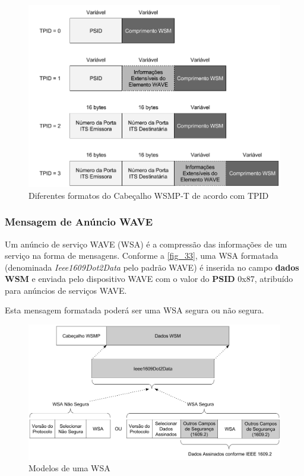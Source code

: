 \documentclass[
12pt,				%
openright,			%
oneside,			%
a4paper,			%
brazil,				%
]{abntex2}
\begin{document}
	\begin{figure} [H]
		\centering
		\includegraphics[scale=.45]{figuras/cap3/32DiferentesFormatosTPID}
		\caption{\label{fig_32}Diferentes formatos do Cabeçalho WSMP-T de acordo com TPID}
	\end{figure}

	\subsubsection{Mensagem de Anúncio WAVE}
	
	\par Um anúncio de serviço WAVE (WSA) é a compressão das informações de um serviço na forma de mensagens. Conforme a \autoref{fig_33}, uma WSA formatada (denominada \textit{Ieee1609Dot2Data} pelo padrão WAVE) é inserida no campo \textbf{dados WSM} e enviada pelo dispositivo WAVE com o valor do \textbf{PSID} 0x87, atribuído para anúncios de serviços WAVE.
	
	\par Esta mensagem formatada poderá ser uma WSA segura ou não segura.
		
	\begin{figure} [H]
		\centering
		\includegraphics[scale=.4]{figuras/cap3/33ModelosWSA}
		\caption{\label{fig_33}Modelos de uma WSA}
	\end{figure}
	
\end{document}
